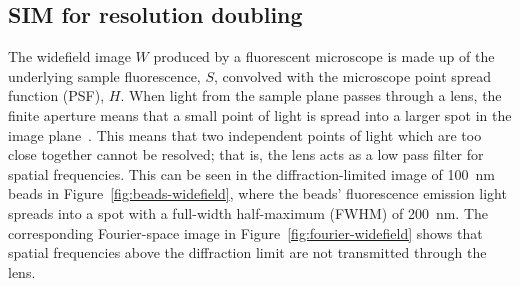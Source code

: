 \subsection{SIM for resolution doubling} \label{sec:SIM-theory}
The widefield image $W$ produced by a fluorescent microscope is made up of the underlying sample fluorescence, $S$, convolved with the microscope point spread function (PSF), $H$.
When light from the sample plane passes through a lens, the finite aperture means that a small point of light is spread into a larger spot in the image plane~\cite[\textit{ch. 11}]{hecht2017optics}.
This means that two independent points of light which are too close together cannot be resolved; that is, the lens acts as a low pass filter for spatial frequencies.
This can be seen in the diffraction-limited image of \SI{100}{\nano\metre} beads in Figure~\ref{fig:beads-widefield}, where the beads' fluorescence emission light spreads into a spot with a full-width half-maximum (FWHM) of \SI{200}{\nano\metre}.
The corresponding Fourier-space image in Figure~\ref{fig:fourier-widefield} shows that spatial frequencies above the diffraction limit are not transmitted through the lens.

